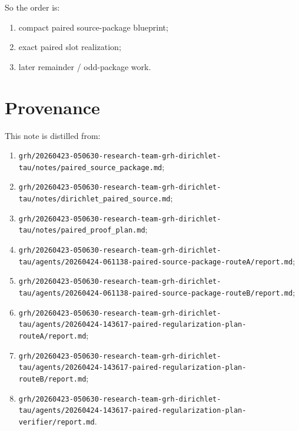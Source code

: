 \documentclass[11pt]{article}
\begin{document}
So the order is:

\begin{enumerate}
\item compact paired source-package blueprint;
\item exact paired slot realization;
\item later remainder / odd-package work.
\end{enumerate}

\section{Provenance}

This note is distilled from:

\begin{enumerate}
\item \texttt{grh/20260423-050630-research-team-grh-dirichlet-tau/notes/paired\_source\_package.md};
\item \texttt{grh/20260423-050630-research-team-grh-dirichlet-tau/notes/dirichlet\_paired\_source.md};
\item \texttt{grh/20260423-050630-research-team-grh-dirichlet-tau/notes/paired\_proof\_plan.md};
\item \texttt{grh/20260423-050630-research-team-grh-dirichlet-tau/agents/20260424-061138-paired-source-package-routeA/report.md};
\item \texttt{grh/20260423-050630-research-team-grh-dirichlet-tau/agents/20260424-061138-paired-source-package-routeB/report.md};
\item \texttt{grh/20260423-050630-research-team-grh-dirichlet-tau/agents/20260424-143617-paired-regularization-plan-routeA/report.md};
\item \texttt{grh/20260423-050630-research-team-grh-dirichlet-tau/agents/20260424-143617-paired-regularization-plan-routeB/report.md};
\item \texttt{grh/20260423-050630-research-team-grh-dirichlet-tau/agents/20260424-143617-paired-regularization-plan-verifier/report.md}.
\end{enumerate}
\end{document}
